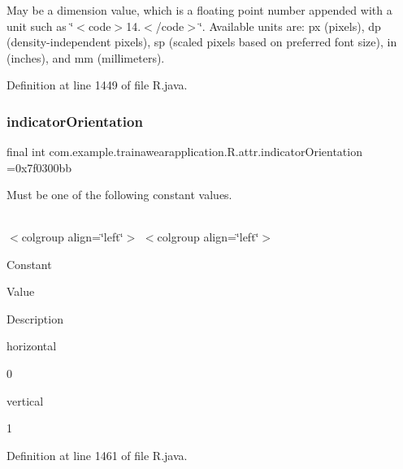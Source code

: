 May be a dimension value, which is a floating point number appended with a unit such as \char`\"{}$<$code$>$14.\+5sp$<$/code$>$\char`\"{}. Available units are\+: px (pixels), dp (density-\/independent pixels), sp (scaled pixels based on preferred font size), in (inches), and mm (millimeters). 

Definition at line 1449 of file R.\+java.

\mbox{\label{classcom_1_1example_1_1trainawearapplication_1_1_r_1_1attr_aa43a016e62b9a649d5ebd9772e9c59d6}} 
\subsubsection{\texorpdfstring{indicatorOrientation}{indicatorOrientation}}
{\footnotesize\ttfamily final int com.\+example.\+trainawearapplication.\+R.\+attr.\+indicator\+Orientation =0x7f0300bb\hspace{0.3cm}{\ttfamily [static]}}

Must be one of the following constant values.

\tabulinesep=1mm
\begin{longtabu}spread 0pt [c]{*{0}{|X[-1]}|}
\hline
\end{longtabu}
$<$colgroup align=\char`\"{}left\char`\"{}$>$ $<$colgroup align=\char`\"{}left\char`\"{}$>$ 

Constant

Value

Description 

horizontal

0

vertical

1

Definition at line 1461 of file R.\+java.

\mbox{\label{classcom_1_1example_1_1trainawearapplication_1_1_r_1_1attr_a484a75b7a68b24729c613f4b21412d0b}} 
